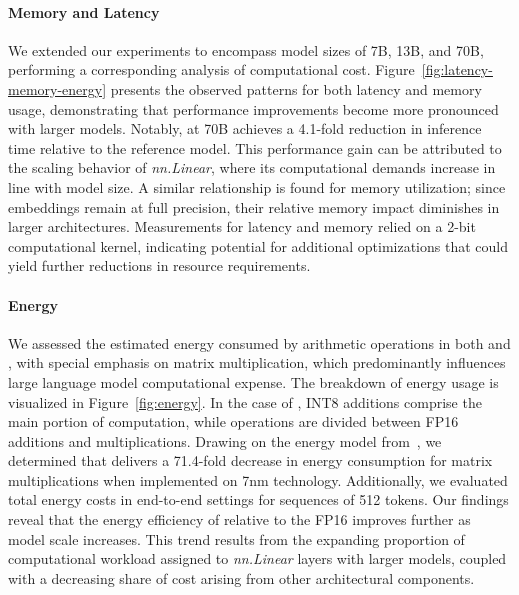 \paragraph{Memory and Latency}

We extended our experiments to encompass model sizes of 7B, 13B, and 70B, performing a corresponding analysis of computational cost. Figure~\ref{fig:latency-memory-energy} presents the observed patterns for both latency and memory usage, demonstrating that performance improvements become more pronounced with larger models. Notably,  at 70B achieves a 4.1-fold reduction in inference time relative to the  reference model. This performance gain can be attributed to the scaling behavior of \emph{nn.Linear}, where its computational demands increase in line with model size. A similar relationship is found for memory utilization; since embeddings remain at full precision, their relative memory impact diminishes in larger architectures. Measurements for latency and memory relied on a 2-bit computational kernel, indicating potential for additional optimizations that could yield further reductions in resource requirements.

\paragraph{Energy}

We assessed the estimated energy consumed by arithmetic operations in both  and , with special emphasis on matrix multiplication, which predominantly influences large language model computational expense. The breakdown of energy usage is visualized in Figure~\ref{fig:energy}. In the case of , INT8 additions comprise the main portion of computation, while  operations are divided between FP16 additions and multiplications. Drawing on the energy model from~\cite{energycost, pokebnn}, we determined that  delivers a 71.4-fold decrease in energy consumption for matrix multiplications when implemented on 7nm technology. Additionally, we evaluated total energy costs in end-to-end settings for sequences of 512 tokens. Our findings reveal that the energy efficiency of  relative to the FP16  improves further as model scale increases. This trend results from the expanding proportion of computational workload assigned to \emph{nn.Linear} layers with larger models, coupled with a decreasing share of cost arising from other architectural components.

